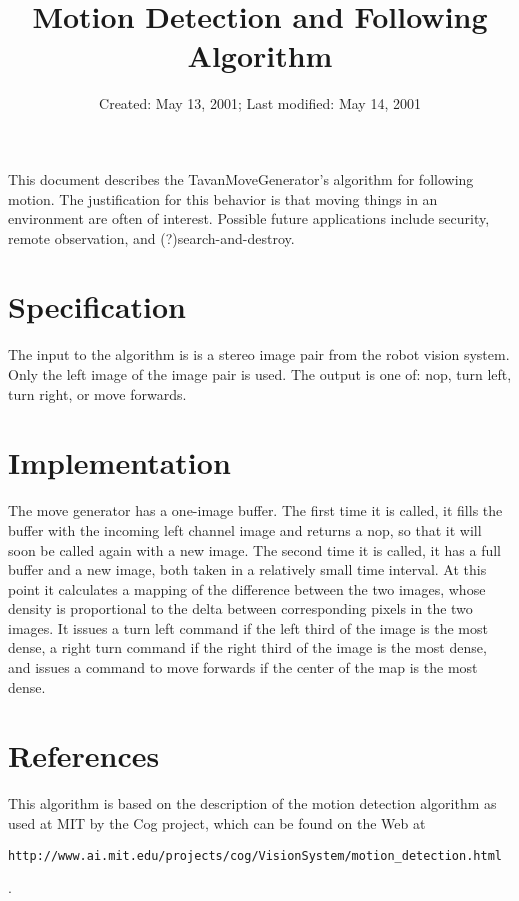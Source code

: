 \documentclass[12pt]{article}
\begin{document}
\title{Motion Detection and Following Algorithm}
\date{Created: May 13, 2001;  Last modified: May 14, 2001}

\maketitle

This document describes the TavanMoveGenerator's algorithm for following motion.  The justification for this behavior is that moving things in an environment are often of interest.  Possible future applications include security, remote observation, and (?)search-and-destroy.

\section{Specification}
The input to the algorithm is is a stereo image pair from the robot vision system.  Only the left image of the image pair is used.  The output is one of: nop, turn left, turn right, or move forwards.

\section{Implementation}
The move generator has a one-image buffer.  The first time it is called, it fills the buffer with the incoming left channel image and returns a nop, so that it will soon be called again with a new image.
The second time it is called, it has a full buffer and a new image, both taken in a relatively small time interval.  At this point it calculates a mapping of the difference between the two images, whose density is proportional to the delta between corresponding pixels in the two images.  It issues a turn left command if the left third of the image is the most dense, a right turn command if the right third of the image is the most dense, and issues a command to move forwards if the center of the map is the most dense.

\section{References}
This algorithm is based on the description of the motion detection algorithm as used at MIT by the Cog project, which can be found on the Web at \begin{verbatim}http://www.ai.mit.edu/projects/cog/VisionSystem/motion_detection.html\end{verbatim}.
\end{document}
